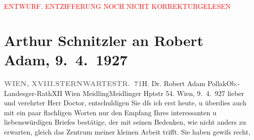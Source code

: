 
\begin{center}
            \textcolor{red}{ENTWURF. ENTZIFFERUNG NOCH NICHT KORREKTURGELESEN}
                      \end{center}
            
               \section[Arthur Schnitzler an Robert Adam, 9. 4. 1927]{ Arthur Schnitzler an Robert Adam, 9. 4. 1927}\nopagebreak{}\rehead{ }\begin{ledgroupsized}[t]{13cm}\normalsize\beginnumbering{} \toendnotes[C]{\smallbreak\pagebreak[2]} 
\toendnotes[C]{\smallbreak}\pstart{}{\pb}\label{T_L02484-1v}\label{T_L02484-1h}\pend{}\pstart{}\textcolor{gray}{\textbf{WIEN, XVIII.}}\pend{}\pstart{}\textcolor{gray}{\textbf{STERNWARTESTR. 71}}\pend{}{\bigskip}\pstart{}H. Dr. Robert Adam Pollak\pend{}\pstart{}Ob.-Landesger-Rath\pend{}\pstart{}XII Wien Meidling\pend{}\pstart{}Meidlinger Hptstr 54.\pend{}{\bigskip}\pstart
           \raggedleft{}{\pb}Wien, 9. 4. 927\pend
           \pstart
           lieber und verehrter Herr Doctor, entschuldigen Sie dſs ich
                    erst heute, u überdies auch mit ein paar flachligen Worten nur den Empfang Ihres
                    interessanten u liebenswürdigen Briefes bestätige, der mit seinen Bedenken, wie
                    nicht anders zu erwarten, gleich das Zentrum meiner kleinen Arbeit trifft. Sie haben gewiſs recht,

\end{ledgroupsized}
